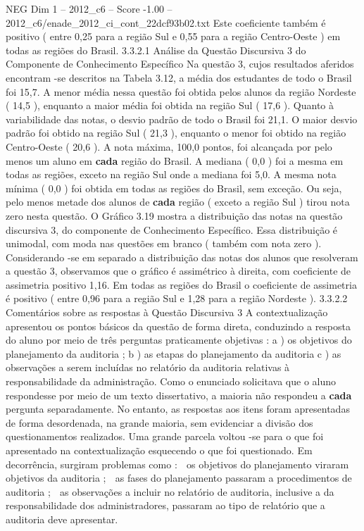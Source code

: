 \begin{textsample}{NEG Dim 1 – 2012\_c6 – Score -1.00 – 2012\_c6/enade\_2012\_ci\_cont\_22dcf93b02.txt}
Este coeficiente também é positivo ( entre 0,25 para a região Sul e 0,55 para a região Centro-Oeste ) em todas as regiões do Brasil. 3.3.2.1 Análise da Questão Discursiva 3 do Componente de Conhecimento Específico Na questão 3, cujos resultados aferidos encontram -se descritos na Tabela 3.12, a média dos estudantes de todo o Brasil foi 15,7.
A menor média nessa questão foi obtida pelos alunos da região Nordeste ( 14,5 ), enquanto a maior média foi obtida na região Sul ( 17,6 ).
Quanto à variabilidade das notas, o desvio padrão de todo o Brasil foi 21,1.
O maior desvio padrão foi obtido na região Sul ( 21,3 ), enquanto o menor foi obtido na região Centro-Oeste ( 20,6 ).
A nota máxima, 100,0 pontos, foi alcançada por pelo menos um aluno em \textbf{cada} região do Brasil.
A mediana ( 0,0 ) foi a mesma em todas as regiões, exceto na região Sul onde a mediana foi 5,0.
A mesma nota mínima ( 0,0 ) foi obtida em todas as regiões do Brasil, sem exceção.
Ou seja, pelo menos metade dos alunos de \textbf{cada} região ( exceto a região Sul ) tirou nota zero nesta questão.
O Gráfico 3.19 mostra a distribuição das notas na questão discursiva 3, do componente de Conhecimento Específico.
Essa distribuição é unimodal, com moda nas questões em branco ( também com nota zero ).
Considerando -se em separado a distribuição das notas dos alunos que resolveram a questão 3, observamos que o gráfico é assimétrico à direita, com coeficiente de assimetria positivo 1,16.
Em todas as regiões do Brasil o coeficiente de assimetria é positivo ( entre 0,96 para a região Sul e 1,28 para a região Nordeste ). 3.3.2.2 Comentários sobre as respostas à Questão Discursiva 3 A contextualização apresentou os pontos básicos da questão de forma direta, conduzindo a resposta do aluno por meio de três perguntas praticamente objetivas : a ) os objetivos do planejamento da auditoria ; b ) as etapas do planejamento da auditoria c ) as observações a serem incluídas no relatório da auditoria relativas à responsabilidade da administração.
Como o enunciado solicitava que o aluno respondesse por meio de um texto dissertativo, a maioria não respondeu a \textbf{cada} pergunta separadamente.
No entanto, as respostas aos itens foram apresentadas de forma desordenada, na grande maioria, sem evidenciar a divisão dos questionamentos realizados.
Uma grande parcela voltou -se para o que foi apresentado na contextualização esquecendo o que foi questionado.
Em decorrência, surgiram problemas como :  os objetivos do planejamento viraram objetivos da auditoria ;  as fases do planejamento passaram a procedimentos de auditoria ;  as observações a incluir no relatório de auditoria, inclusive a da responsabilidade dos administradores, passaram ao tipo de relatório que a auditoria deve apresentar.

\end{textsample}
